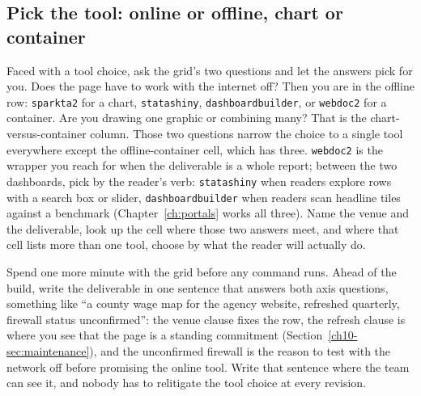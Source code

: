 \documentclass[
    a4paper,
    fontsize=10pt,
    twoside=true,
    numbers=noenddot,
]{kaobook}
\begin{document}
\subsection{Pick the tool: online or offline, chart or container}\label{sec:suite-choose}
Faced with a tool choice, ask the grid's two questions and let the answers pick for you. Does the page have to work with the internet off? Then you are in the offline row: \texttt{sparkta2} for a chart, \texttt{statashiny}, \texttt{dashboardbuilder}, or \texttt{webdoc2} for a container. Are you drawing one graphic or combining many? That is the chart-versus-container column. Those two questions narrow the choice to a single tool everywhere except the offline-container cell, which has three. \texttt{webdoc2} is the wrapper you reach for when the deliverable is a whole report; between the two dashboards, pick by the reader's verb: \texttt{statashiny} when readers explore rows with a search box or slider, \texttt{dashboardbuilder} when readers scan headline tiles against a benchmark (Chapter~\ref{ch:portals} works all three). Name the venue and the deliverable, look up the cell where those two answers meet, and where that cell lists more than one tool, choose by what the reader will actually do.

Spend one more minute with the grid before any command runs. Ahead of the build, write the deliverable in one sentence that answers both axis questions, something like \enquote{a county wage map for the agency website, refreshed quarterly, firewall status unconfirmed}: the venue clause fixes the row, the refresh clause is where you see that the page is a standing commitment (Section~\ref{ch10-sec:maintenance}), and the unconfirmed firewall is the reason to test with the network off before promising the online tool. Write that sentence where the team can see it, and nobody has to relitigate the tool choice at every revision.
\end{document}
